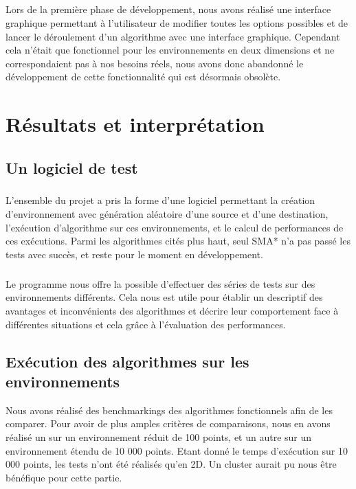 \documentclass[pidr]{tnreport}
\begin{document}
\paragraph{}
Lors de la première phase de développement, nous avons réalisé une interface graphique permettant à l'utilisateur de modifier toutes les options possibles et de lancer le déroulement d'un algorithme avec une interface graphique. Cependant cela n'était que fonctionnel pour les environnements en deux dimensions et ne correspondaient pas à nos besoins réels, nous avons donc abandonné le développement de cette fonctionnalité qui est désormais obsolète.

\chapter{Résultats et interprétation}
	
	\section{Un logiciel de test}	
\paragraph{}
L'ensemble du projet a pris la forme d'une logiciel permettant la création d’environnement avec génération aléatoire d'une source et d'une destination, l’exécution d'algorithme sur ces environnements, et le calcul de performances de ces exécutions. Parmi les algorithmes cités plus haut, seul SMA* n'a pas passé les tests avec succès, et reste pour le moment en développement. 

\paragraph{}
Le programme nous offre la possible d'effectuer des séries de tests sur des environnements différents. Cela nous est utile pour établir un descriptif des avantages et inconvénients des algorithmes et décrire leur comportement face à différentes situations et cela grâce à l'évaluation des performances. 
	
	\section{Exécution des algorithmes sur les environnements}
	
	Nous avons réalisé des benchmarkings des algorithmes fonctionnels afin de les comparer. Pour avoir de plus amples critères de comparaisons, nous en avons réalisé un sur un environnement réduit de 100 points, et un autre sur un environnement étendu de 10 000 points. Etant donné le temps d'exécution sur 10 000 points, les tests n'ont été réalisés qu'en 2D. Un cluster aurait pu nous être bénéfique pour cette partie.
	
\end{document}
